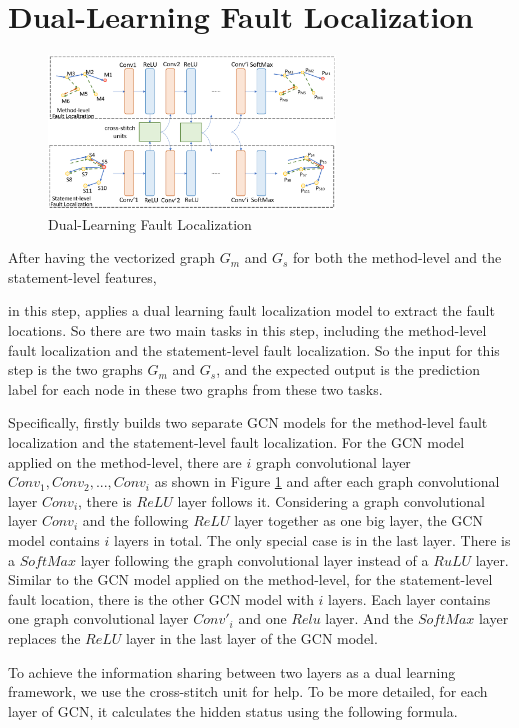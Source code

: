 \section{Dual-Learning Fault Localization}

\begin{figure}[t]
	\centering
	\includegraphics[width=3in]{graphs/dual-learning.png}
	\caption{Dual-Learning Fault Localization}
	\label{dual-learning}
\end{figure}


After having the vectorized graph $G_m$ and $G_s$ for both the method-level and the statement-level features, 

in this step, \tool applies a dual learning fault localization model to extract the fault locations. So there are two main tasks in this step, including the method-level fault localization and the statement-level fault localization. So the input for this step is the two graphs $G_m$ and $G_s$, and the expected output is the prediction label for each node in these two graphs from these two tasks.

Specifically, \tool firstly builds two separate GCN models \cite{kipf2016semi} for the method-level fault localization and the statement-level fault localization. For the GCN model applied on the method-level, there are $i$ graph convolutional layer $Conv_1, Conv_2, ..., Conv_i$ as shown in Figure \ref{dual-learning} and after each graph convolutional layer $Conv_i$, there is $ReLU$ layer follows it. Considering a graph convolutional layer $Conv_i$ and the following $ReLU$ layer together as one big layer, the GCN model contains $i$ layers in total. The only special case is in the last layer. There is a $SoftMax$ layer following the graph convolutional layer instead of a $RuLU$ layer. Similar to the GCN model applied on the method-level, for the statement-level fault location, there is the other GCN model with $i$ layers. Each layer contains one graph convolutional layer $Conv'_i$ and one $Relu$ layer. And the $SoftMax$ layer replaces the $ReLU$ layer in the last layer of the GCN model.

To achieve the information sharing between two layers as a dual learning framework, we use the cross-stitch unit \cite{misra2016cross} for help. To be more detailed, for each layer of GCN, it calculates the hidden status using the following formula.

